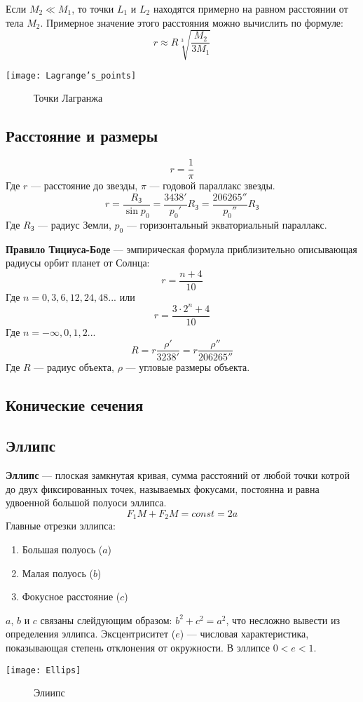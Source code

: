 \documentclass[10pt,a5paper]{article}
\begin{document}
Если $M_2\ll M_1$, то точки $L_1$ и $L_2$ находятся примерно на равном расстоянии от тела $M_2$. Примерное значение этого расстояния можно вычислить по формуле:
$$r\approx R\sqrt[3]{\frac{M_2}{3M_1}}$$
\begin{center}
\texttt{[image: Lagrange's\_points]}
\begin{figure}[h!]
\caption{Точки Лагранжа}
\end{figure}
\end{center}
\subsection*{Расстояние и размеры}
$$r=\frac{1}{\pi}$$
Где $r$ --- расстояние до звезды, $\pi$ --- годовой параллакс звезды.
$$r=\frac{R_{\text{З}}}{\sin p_0}=\frac{3438'}{p_0'}R_{\text{З}}=\frac{206265''}{p_0''}R_{\text{З}}$$
Где $R_{\text{З}}$ --- радиус Земли, $p_0$ --- горизонтальный экваториальный параллакс.

\textbf{Правило Тициуса-Боде} --- эмпирическая формула приблизительно описывающая радиусы орбит планет от Солнца:
$$r=\frac{n+4}{10}$$
Где $n=0, 3 ,6, 12, 24, 48...$ или
$$r=\frac{3\cdot 2^n+4}{10}$$
Где $n=-\infty, 0, 1, 2...$
$$R=r\frac{\rho'}{3238'}=r\frac{\rho''}{206265''}$$
Где $R$ --- радиус объекта, $\rho$ --- угловые размеры объекта.
\begin{center}
\section*{Конические сечения}
\end{center}
\subsection*{Эллипс}
\textbf{Эллипс} --- плоская замкнутая кривая, сумма расстояний от любой точки котрой до двух фиксированных точек, называемых фокусами, постоянна и равна удвоенной большой полуоси эллипса.
$$F_1M+F_2M=const=2a$$
Главные отрезки эллипса:
\begin{enumerate}
\item Большая полуось ($a$)
\item Малая полуось ($b$)
\item Фокусное расстояние ($c$)
\end{enumerate}
$a$, $b$ и $c$ связаны слейдующим образом: $b^2+c^2=a^2$, что несложно вывести из определения эллипса.
 Эксцентриситет ($e$) --- числовая характеристика, показывающая степень отклонения от окружности. В эллипсе $0<e<1$.
 \begin{center}
\texttt{[image: Ellips]}
\begin{figure}[h!]
\caption{Элиипс}
\end{figure}
\end{center}
\end{document}
